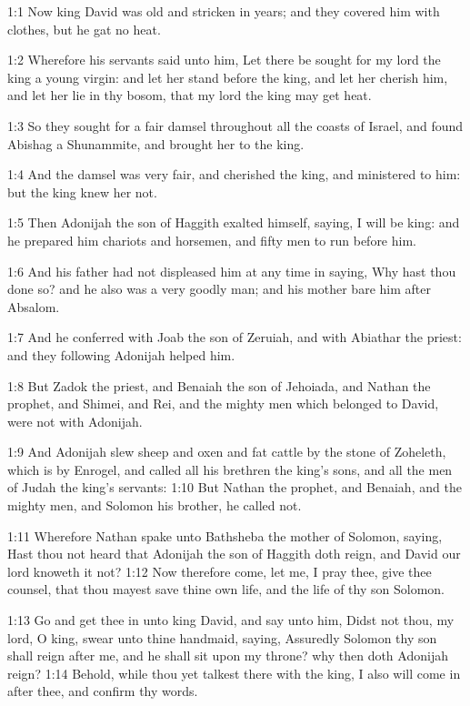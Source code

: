 
1:1 Now king David was old and stricken in years; and they covered
him with clothes, but he gat no heat.

1:2 Wherefore his servants said unto him, Let there be sought for my
lord the king a young virgin: and let her stand before the king, and
let her cherish him, and let her lie in thy bosom, that my lord the
king may get heat.

1:3 So they sought for a fair damsel throughout all the coasts of
Israel, and found Abishag a Shunammite, and brought her to the king.

1:4 And the damsel was very fair, and cherished the king, and
ministered to him: but the king knew her not.

1:5 Then Adonijah the son of Haggith exalted himself, saying, I will
be king: and he prepared him chariots and horsemen, and fifty men to
run before him.

1:6 And his father had not displeased him at any time in saying, Why
hast thou done so? and he also was a very goodly man; and his mother
bare him after Absalom.

1:7 And he conferred with Joab the son of Zeruiah, and with Abiathar
the priest: and they following Adonijah helped him.

1:8 But Zadok the priest, and Benaiah the son of Jehoiada, and Nathan
the prophet, and Shimei, and Rei, and the mighty men which belonged to
David, were not with Adonijah.

1:9 And Adonijah slew sheep and oxen and fat cattle by the stone of
Zoheleth, which is by Enrogel, and called all his brethren the king's
sons, and all the men of Judah the king's servants: 1:10 But Nathan
the prophet, and Benaiah, and the mighty men, and Solomon his brother,
he called not.

1:11 Wherefore Nathan spake unto Bathsheba the mother of Solomon,
saying, Hast thou not heard that Adonijah the son of Haggith doth
reign, and David our lord knoweth it not?  1:12 Now therefore come,
let me, I pray thee, give thee counsel, that thou mayest save thine
own life, and the life of thy son Solomon.

1:13 Go and get thee in unto king David, and say unto him, Didst not
thou, my lord, O king, swear unto thine handmaid, saying, Assuredly
Solomon thy son shall reign after me, and he shall sit upon my throne?
why then doth Adonijah reign?  1:14 Behold, while thou yet talkest
there with the king, I also will come in after thee, and confirm thy
words.

